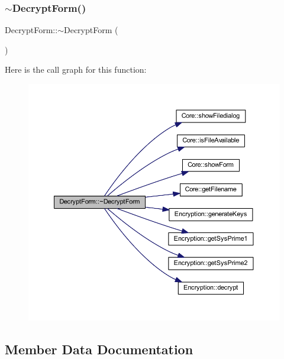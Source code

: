 \hypertarget{class_decrypt_form_acbf539168ee44015720d6edb380ec4cf}{}\label{class_decrypt_form_acbf539168ee44015720d6edb380ec4cf} 
\subsubsection{\texorpdfstring{$\sim$\+Decrypt\+Form()}{~DecryptForm()}}
{\footnotesize\ttfamily Decrypt\+Form\+::$\sim$\+Decrypt\+Form (\begin{DoxyParamCaption}{ }\end{DoxyParamCaption})}

Here is the call graph for this function\+:
\nopagebreak
\begin{figure}[H]
\begin{center}
\leavevmode
\includegraphics[width=350pt]{class_decrypt_form_acbf539168ee44015720d6edb380ec4cf_cgraph}
\end{center}
\end{figure}


\subsection{Member Data Documentation}
\hypertarget{class_decrypt_form_af0a16237e0a531f3167acd67eae7e69b}{}\label{class_decrypt_form_af0a16237e0a531f3167acd67eae7e69b} 
